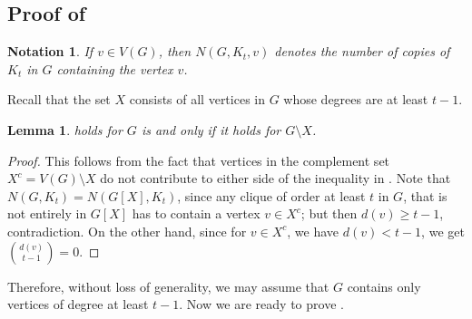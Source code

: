 \documentclass[pdflatex,sn-basic,Numbered]{sn-jnl}
\newtheorem{lemma}{Lemma}
\newtheorem{notation}{Notation}
\begin{document}
\subsection{Proof of }\label{vertexdegreeproof}
\begin{notation}
    If $v \in V(G)$, then $N(G,K_t,v)$ denotes the number of copies of $K_t$ in $G$ containing the vertex $v$.
\end{notation}
Recall that the set $X$ consists of all vertices in $G$ whose degrees are at least $t-1$.
\begin{lemma}\label{lem1}
 holds for $G$ is and only if it holds for $G\setminus X$.
\end{lemma}
\begin{proof}This follows from the fact that vertices in the complement set $X^c=V(G) \setminus X$ do not contribute to either side of the inequality in . Note that $N(G,K_t) = N(G[X],K_t)$, since any clique of order at least $t$ in $G$, that is not entirely in $G[X]$ has to contain a vertex $v \in X^c$; but then $d(v) \geq t-1$, contradiction. On the other hand, since for $v \in X^c$, we have $d(v) < t-1$, we get ${d(v) \choose t-1} = 0$. 
 \end{proof}
Therefore, without loss of generality, we may assume that $G$ contains only vertices of degree at least $t-1$. Now we are ready to prove .
\end{document}
